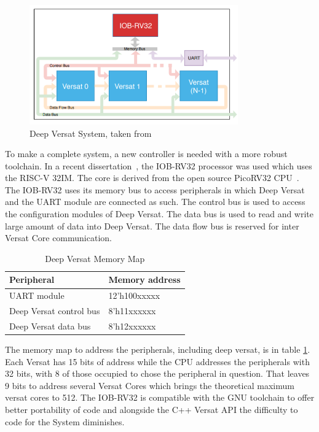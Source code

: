 \begin{figure}[!htbp]
    \centering
    \includegraphics[width=0.8\textwidth]{Figures/deep-versat-top.png}
    \caption{Deep Versat System, taken from~\cite{valter:deepversat}}
    \label{figure:deepversattop}
\end{figure} 

\quad To make a complete system, a new controller is needed with a more robust toolchain.
In a recent dissertation~\cite{valter:deepversat}, the IOB-RV32 processor was used which uses the RISC-V 32IM. The core is derived from
the open source PicoRV32 CPU~\cite{picorv}.
The IOB-RV32 uses its memory bus to access peripherals in which Deep Versat and the UART module are connected as such.
The control bus is used to access the configuration modules of Deep Versat. The data bus is used to read and write
large amount of data into Deep Versat. The data flow bus is reserved for inter Versat Core communication.

\begin{table}[!htbp]
    \centering
    \begin{tabular}{|ll|}
        \hline
        \textbf{Peripheral}     & \textbf{Memory address} \\ \hline
        UART module             & 12’h100xxxxx            \\ \hline
        Deep Versat control bus & 8’h11xxxxxx             \\ \hline
        Deep Versat data bus    & 8’h12xxxxxx             \\ \hline
        \end{tabular}
    \caption{Deep Versat Memory Map}
    \label{table:deepversat}
    \end{table}


The memory map to address the peripherals,
 including deep versat, is in table \ref{table:deepversat}.
 Each Versat has 15 bits of address while the CPU addresses
 the peripherals with 32 bits, with 8 of those occupied to chose
 the peripheral in question. That leaves 9 bits to address several Versat Cores
 which brings the theoretical maximum versat cores to 512. The IOB-RV32 is compatible with the
 GNU toolchain to offer better portability of code and alongside the C++ Versat API the difficulty
 to code for the System diminishes.
